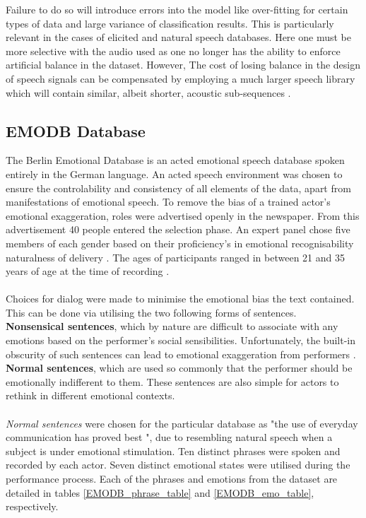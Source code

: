Failure to do so will introduce errors into the model like over-fitting for certain types of data and large variance of classification results. This is particularly relevant in the cases of elicited and natural speech databases. Here one must be more selective with the audio used as one no longer has the ability to enforce artificial balance in the dataset. However, The cost of losing balance in the design of speech signals can be compensated by employing a much larger speech library which will contain similar, albeit shorter, acoustic sub-sequences \cite{campbell_2000_databases}.

\subsection{EMODB Database}
The Berlin Emotional Database is an acted emotional speech database spoken entirely in the German language. An acted speech environment was chosen to ensure the controlability and consistency of all elements of the data, apart from manifestations of emotional speech. To remove the bias of a trained actor's emotional exaggeration, roles were advertised openly in the newspaper. From this advertisement 40 people entered the selection phase. An expert panel chose five members of each gender based on their proficiency's in emotional recognisability naturalness of delivery \cite{EMODB_05b_doc}. The ages of participants ranged in between 21 and 35 years of age at the time of recording \cite{EMODB_97}.\\ \\
Choices for dialog were made to minimise the emotional bias the text contained. This can be done via utilising the two following forms of sentences.\\
\textbf{Nonsensical sentences}, which by nature are difficult to associate with any emotions based on the performer's social sensibilities. Unfortunately, the built-in obscurity of such sentences can lead to emotional exaggeration from performers \cite{scherer1981speech}.\\
\textbf{Normal sentences}, which are used so commonly that the performer should be emotionally indifferent to them. These sentences are also simple for actors to rethink in different emotional contexts.\\ \\
\textit{Normal sentences} were chosen for the particular database as "the
use of everyday communication has proved best \cite{scherer1981speech}", due to resembling natural speech when a subject is under emotional stimulation. Ten distinct phrases were spoken and recorded by each actor. Seven distinct emotional states were utilised during the performance process. Each of the phrases and emotions from the dataset are detailed in tables \ref{EMODB_phrase_table} and \ref{EMODB_emo_table}, respectively.
